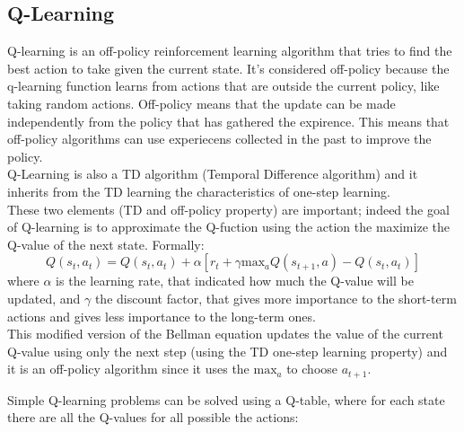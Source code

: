 \documentclass[14pt]{extarticle}
\def\sp{\vspace{5pt}}
\def\ppn{\vspace{10pt}}
\begin{document}
\begin{flushleft}
\subsection{Q-Learning} \label{complex}
\sp
Q-learning is an off-policy reinforcement learning algorithm that tries to find the best action to take given the current state. It's considered off-policy because the q-learning function learns from actions that are outside the current policy, like taking random actions. Off-policy means that the update can be made independently from the policy that has gathered the expirence. This means that off-policy algorithms can use experiecens collected in the past to improve the policy.\\
Q-Learning is also a TD algorithm (Temporal Difference algorithm\cite{TDl}) and it inherits from the TD learning the characteristics of one-step learning.\\
These two elements (TD and off-policy property) are important; indeed the goal of Q-learning is to approximate the Q-fuction using the action the maximize the Q-value of the next state. Formally:
\begin{equation} \label{eq:2}
 Q(s_t,a_t) = Q(s_t,a_t) + 
\alpha[r_t + \gamma \text{max}_{a}Q(s_{t+1},a) - Q(s_t,a_t)] 
\end{equation}
where $\alpha$ is the learning rate, that indicated how much the Q-value will be updated, and $\gamma$ the discount factor, that gives more importance to the short-term actions and gives less importance to the long-term ones. \\
This modified version of the Bellman equation updates the value of the current Q-value using only the next step (using the TD one-step learning property) and it is an off-policy 
algorithm since it uses the $\text{max}_{a}$ to choose $a_{t+1}$.

\ppn
Simple Q-learning problems can be solved using a Q-table, where for each state there are all the Q-values for all possible the actions:


\end{flushleft}
\end{document}
